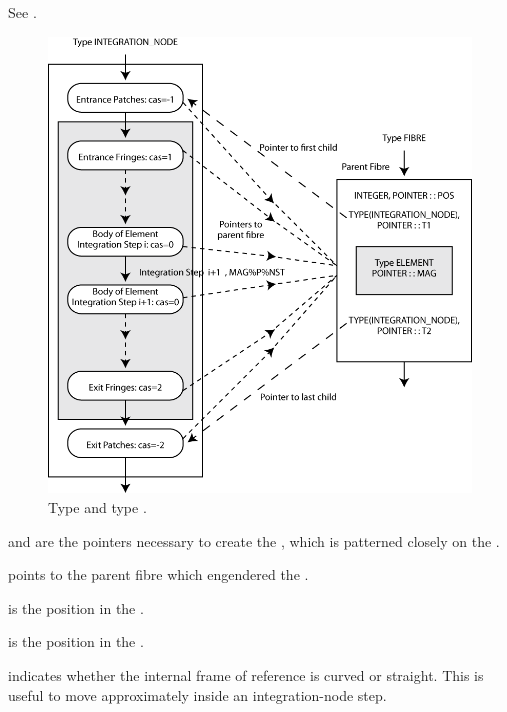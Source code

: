 See .

\begin{figure}[ht]\forcerectofloat
  \centering
  \includegraphics[width=\textwidth]{illustrations/integration-node-and-fibre}
  \caption{Type  and type .}
  \label{fig:TYPE.INTEGRATION.NODE}
\end{figure}

 and  are the pointers necessary to create the ,
which is patterned closely on the .

 points to the parent fibre which engendered the 
.

 is the position in the .

 is the position in the .

 indicates whether the internal frame of reference is
curved or straight. This is useful to move approximately inside an integration-node
step.

